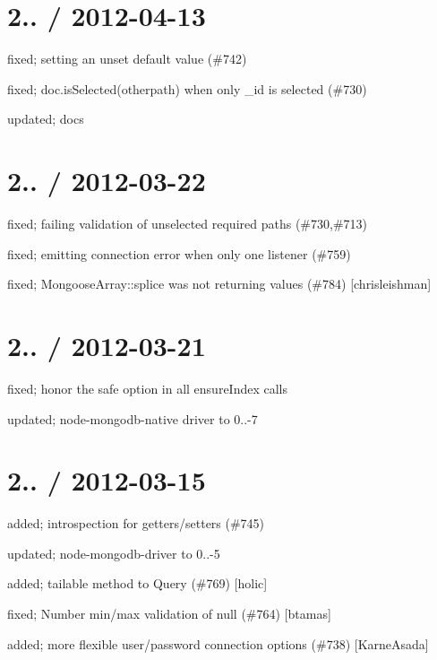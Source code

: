 \section*{2.. / 2012-\/04-\/13 }


\begin{DoxyItemize}
\item fixed; setting an unset default value (\#742)
\item fixed; doc.\+is\+Selected(otherpath) when only \+\_\+id is selected (\#730)
\item updated; docs
\end{DoxyItemize}

\section*{2.. / 2012-\/03-\/22 }


\begin{DoxyItemize}
\item fixed; failing validation of unselected required paths (\#730,\#713)
\item fixed; emitting connection error when only one listener (\#759)
\item fixed; Mongoose\+Array\+::splice was not returning values (\#784) \mbox{[}chrisleishman\mbox{]}
\end{DoxyItemize}

\section*{2.. / 2012-\/03-\/21 }


\begin{DoxyItemize}
\item fixed; honor the {\ttfamily safe} option in all ensure\+Index calls
\item updated; node-\/mongodb-\/native driver to 0..-\/7
\end{DoxyItemize}

\section*{2.. / 2012-\/03-\/15 }


\begin{DoxyItemize}
\item added; introspection for getters/setters (\#745)
\item updated; node-\/mongodb-\/driver to 0..-\/5
\item added; tailable method to Query (\#769) \mbox{[}holic\mbox{]}
\item fixed; Number min/max validation of null (\#764) \mbox{[}btamas\mbox{]}
\item added; more flexible user/password connection options (\#738) \mbox{[}Karne\+Asada\mbox{]}
\end{DoxyItemize}

